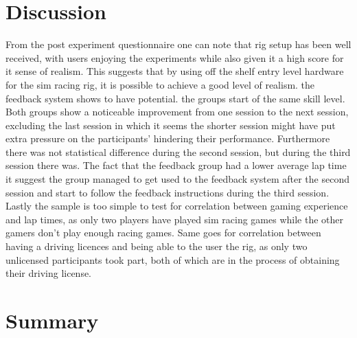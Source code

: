 \section{Discussion}
\label{sec:eval-Discussion}
From the post experiment questionnaire one can note that rig setup has been well received, with users enjoying the experiments while also given it a high score for it sense of realism. This suggests that by using off the shelf entry level hardware for the sim racing rig, it is possible to achieve a good level of realism. the feedback system shows to have potential. the groups start of the same skill level. Both groups show a noticeable improvement from one session to the next session, excluding the last session in which it seems the shorter session might have put extra pressure on the participants' hindering their performance. Furthermore there was not statistical difference during the second session, but during the third session there was. The fact that the feedback group had a lower average lap time it suggest the group managed to get used to the feedback system after the second session and start to follow the feedback instructions during the third session. Lastly the sample is too simple to test for correlation between gaming experience and lap times, as only two players have played sim racing games while the other gamers don't play enough racing games. Same goes for correlation between having a driving licences and being able to the user the rig, as only two unlicensed participants took part, both of which are in the process of obtaining their driving license.

\section{Summary}